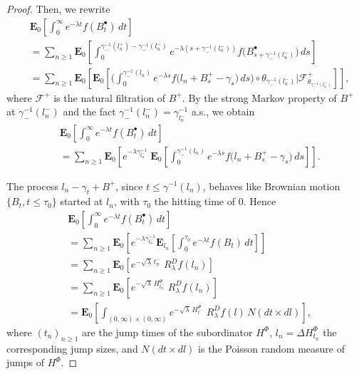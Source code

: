 \documentclass[11pt,a4paper]{article}
\theoremstyle{plain}
\theoremstyle{definition}
\theoremstyle{remark}
\begin{document}
\begin{proof}
			Then, we rewrite
			\begin{align*}
				&\mathbf{E}_{0}  \left[\int_0^\infty e^{-\lambda t} f(B^\bullet_t)\,dt\right]\\
				&=\sum_{n \geq 1}  \mathbf{E}_{0} \left[\int_0^{\gamma_{-}^{-1}(l_n^+)-\gamma_{-}^{-1}(l_n^-)} e^{-\lambda (s + \gamma_{-}^{-1}(l_n^-))} f\big(B^\bullet_{s + \gamma_{-}^{-1}(l_n^-)}\big)\,ds\right]\\
				&=\sum_{n \geq 1} \mathbf{E}_{0}\!\left[ \mathbf{E}_{0}\!\left[ \Big(\int_0^{\gamma_{-}^{-1}(l_n)} e^{-\lambda s } f\big(l_n + B^+_s - \gamma_s\big)\,ds\Big)\circ \theta_{\gamma^{-1}_{-}(l_n^-)} \Big\vert \mathcal{F}^+_{\theta_{\gamma_{-}^{-1}(l_n^-)}}\right]\right],
			\end{align*}
			where \(\mathcal{F}^+\) is the natural filtration of \(B^+\). By the strong Markov property of \(B^+\) at \(\gamma_{-}^{-1}(l_n^-)\) and the fact \(\gamma_{-}^{-1}(l_n^-)= \gamma^{-1}_{l_n^-}\) a.s., we obtain
			\begin{align*}
				&\mathbf{E}_{0}  \left[\int_0^\infty e^{-\lambda t} f(B^\bullet_t)\,dt\right]\\
				&=\sum_{n \geq 1} \mathbf{E}_{0}\!\left[e^{-\lambda \gamma^{-1}_{l_n^-}} \; \mathbf{E}_{0}\!\left[\int_0^{\gamma_{-}^{-1}(l_n)} e^{-\lambda s } f\big(l_n + B^+_s - \gamma_s\big)\,ds \right] \right].
			\end{align*}
			
			The process \(l_n - \gamma_t + B^+\), since \(t \leq \gamma^{-1}(l_n)\), behaves like Brownian motion \(\{B_t, t \leq \tau_0\}\) started at \(l_n\), with \(\tau_0\) the hitting time of \(0\). Hence
			\begin{align*}
				&\mathbf{E}_{0}\!\left[\int_0^\infty e^{-\lambda t} f(B^\bullet_t)\,dt\right]\\
				&= \sum_{n \geq 1} 
				\mathbf{E}_{0}\!\left[
				e^{-\lambda \gamma^{-1}_{t_n^-}}
				\mathbf{E}_{l_n}\!\left[\int_{0}^{\tau_0} e^{-\lambda t} f(B_t)\,dt \right]
				\right]\\
				&= \sum_{n \geq 1} 
				\mathbf{E}_{0}\!\left[
				e^{-\sqrt{\lambda}\, t_n^-}\;
				R_\lambda^D f(l_n)
				\right]\\
				&= \sum_{n \geq 1} 
				\mathbf{E}_{0}\!\left[
				e^{-\sqrt{\lambda}\, H^\Phi_{t_n^-}}\;
				R_\lambda^D f(l_n)
				\right]\\
				&= \mathbf{E}_{0}\!\left[
				\int_{(0,\infty)\times(0,\infty)}
				e^{-\sqrt{\lambda}\, H^\Phi_{t^-}}\;
				R_\lambda^D f(l)\,
				N(dt\times dl)
				\right],
			\end{align*}
			where \((t_n)_{n\ge1}\) are the jump times of the subordinator \(H^\Phi\), \(l_n=\Delta H^\Phi_{t_n}\) the corresponding jump sizes, and \(N(dt\times dl)\) is the Poisson random measure of jumps of \(H^\Phi\).
			

\end{proof}
\end{document}
